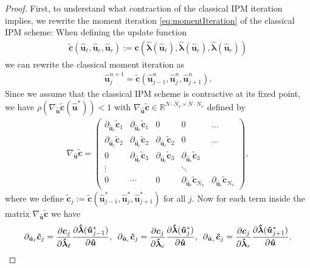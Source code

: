 \begin{proof}
First, to understand what contraction of the classical IPM iteration implies, we rewrite the moment iteration \eqref{eq:momentIteration} of the classical IPM scheme: When defining the update function
\begin{align*}
\bm{\tilde c}\left(\bm{\hat{u}}_{\ell},\bm{\hat{u}}_{c},\bm{\hat{u}}_{r}\right):=\bm{c}\left(\bm{\hat{\lambda}}(\bm{\hat{u}}_{\ell}),\bm{\hat{\lambda}}(\bm{\hat{u}}_{c}),\bm{\hat{\lambda}}(\bm{\hat{u}}_{r})\right)
\end{align*}
we can rewrite the classical moment iteration as
\begin{align}\label{eq:shortIPMIt}
\bm{\hat u}_j^{n+1} = \bm{\tilde c}\left(\bm{\hat u}_{j-1}^n,\bm{\hat u}_{j}^n,\bm{\hat u}_{j+1}^n\right).
\end{align}
Since we assume that the classical IPM scheme is contractive at its fixed point, we have $\rho (\nabla_{\bm{\hat u}}\bm{\tilde c}(\bm{\hat u}^*))<1$ with $\nabla_{\bm{\hat u}}\bm{\tilde c}\in\mathbb{R}^{N\cdot N_x\times N\cdot N_x}$ defined by
\begin{align*}
\nabla_{\bm{\hat u}}\bm{\tilde c} = 
\begin{pmatrix} 
    \partial_{\bm{\hat u}_c}\bm{\tilde c}_{1} & \partial_{\bm{\hat u}_r}\bm{\tilde c}_{1}& 0 & 0 & \dots \\
    \partial_{\bm{\hat u}_{\ell}}\bm{\tilde c}_{2} & \partial_{\bm{\hat u}_c}\bm{\tilde c}_{2} & \partial_{\bm{\hat u}_r}\bm{\tilde c}_{2}& 0 & \dots \\
    0 & \partial_{\bm{\hat u}_{\ell}}\bm{\tilde c}_{3} & \partial_{\bm{\hat u}_c}\bm{\tilde c}_{3} & \partial_{\bm{\hat u}_r}\bm{\tilde c}_{3}\\
    \vdots & & & \ddots & \\
    0 &\cdots &  0 & \partial_{\bm{\hat u}_{\ell}}\bm{\tilde c}_{N_x} & \partial_{\bm{\hat u}_c}\bm{\tilde c}_{N_x}
    \end{pmatrix},
\end{align*}
where we define $\bm{\tilde c}_{j}:=\bm{\tilde c}\left(\bm{\hat u}_{j-1}^*,\bm{\hat u}_{j}^*,\bm{\hat u}_{j+1}^*\right)$ for all $j$. Now for each term inside the matrix $\nabla_{\bm{\hat u}}\bm{\tilde c}$ we have 
\begin{align}\label{eq:cTildeDer}
\partial_{\bm{\hat u}_{\ell}}\bm{\tilde c}_{j} = \frac{\partial \bm{c}_j}{\partial \bm{\hat \lambda}_{\ell}}\frac{\partial \bm{\hat \lambda}(\bm{\hat u}_{j-1}^*)}{\partial \bm{\hat u}},\enskip\partial_{\bm{\hat u}_c}\bm{\tilde c}_{j} = \frac{\partial \bm{c}_j}{\partial \bm{\hat \lambda}_c}\frac{\partial \bm{\hat \lambda}(\bm{\hat u}_j^*)}{\partial \bm{\hat u}},\enskip\partial_{\bm{\hat u}_r}\bm{\tilde c}_{j} = \frac{\partial \bm{c}_j}{\partial \bm{\hat \lambda}_r}\frac{\partial \bm{\hat \lambda}(\bm{\hat u}_{j+1}^*)}{\partial \bm{\hat u}}.

\end{align}
\end{proof}
